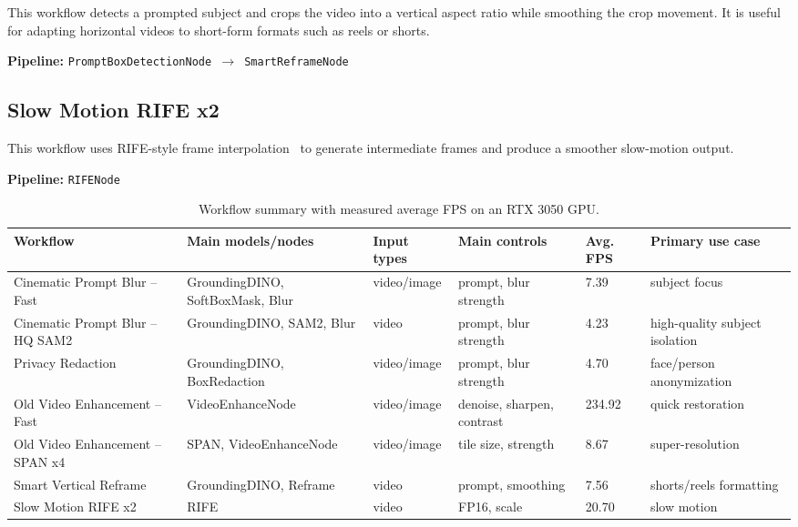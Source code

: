 \documentclass[11pt,a4paper]{article}
\begin{document}
This workflow detects a prompted subject and crops the video into a vertical aspect ratio while smoothing the crop movement. It is useful for adapting horizontal videos to short-form formats such as reels or shorts.

\noindent\textbf{Pipeline:} \texttt{PromptBoxDetectionNode $\rightarrow$ SmartReframeNode}

\subsection{Slow Motion RIFE x2}

This workflow uses RIFE-style frame interpolation~\cite{huang2022rife} to generate intermediate frames and produce a smoother slow-motion output.

\noindent\textbf{Pipeline:} \texttt{RIFENode}

\begin{table}[H]
\centering
\caption{Workflow summary with measured average FPS on an RTX 3050 GPU.}
\label{tab:workflow_summary}
\small
\begin{tabularx}{\linewidth}{L{2.4cm} L{2.7cm} L{1.6cm} L{2.4cm} L{1.6cm} Y}
\toprule
\textbf{Workflow} & \textbf{Main models/nodes} & \textbf{Input types} & \textbf{Main controls} & \textbf{Avg. FPS} & \textbf{Primary use case} \\
\midrule
Cinematic Prompt Blur -- Fast & GroundingDINO, SoftBoxMask, Blur & video/image & prompt, blur strength & 7.39 & subject focus \\
Cinematic Prompt Blur -- HQ SAM2 & GroundingDINO, SAM2, Blur & video & prompt, blur strength & 4.23 & high-quality subject isolation \\
Privacy Redaction & GroundingDINO, BoxRedaction & video/image & prompt, blur strength & 4.70 & face/person anonymization \\
Old Video Enhancement -- Fast & VideoEnhanceNode & video/image & denoise, sharpen, contrast & 234.92 & quick restoration \\
Old Video Enhancement -- SPAN x4 & SPAN, VideoEnhanceNode & video/image & tile size, strength & 8.67 & super-resolution \\
Smart Vertical Reframe & GroundingDINO, Reframe & video & prompt, smoothing & 7.56 & shorts/reels formatting \\
Slow Motion RIFE x2 & RIFE & video & FP16, scale & 20.70 & slow motion \\
\bottomrule
\end{tabularx}
\end{table}
\end{document}
